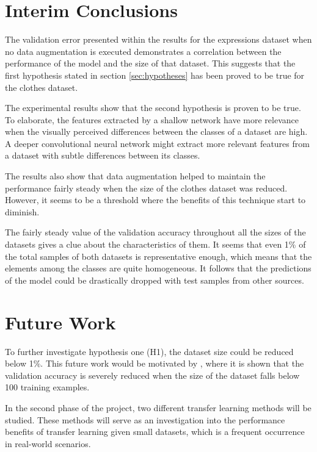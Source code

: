 \documentclass{article}
\begin{document}
\section{Interim Conclusions}
\label{sec:conclusions}

The validation error presented within the results for the expressions dataset when no data augmentation is executed demonstrates a correlation between the performance of the model and the size of that dataset. This suggests that the first hypothesis stated in section \ref{sec:hypotheses} has been proved to be true for the clothes dataset. 

The experimental results show that the second hypothesis is proven to be true. To elaborate, the features extracted by a shallow network have more relevance when the visually perceived differences between the classes of a dataset are high. A deeper convolutional neural network might extract more relevant features from a dataset with subtle differences between its classes.

The results also show that data augmentation helped to maintain the performance fairly steady when the size of the clothes dataset was reduced. However, it seems to be a threshold where the benefits of this technique start to diminish.

The fairly steady value of the validation accuracy throughout all the sizes of the datasets gives a clue about the characteristics of them. It seems that even 1\% of the total samples of both datasets is representative enough, which means that the elements among the classes are quite homogeneous. It follows that the predictions of the model could be drastically dropped with test samples from other sources.


\section{Future Work}
\label{sec:future}

To further investigate hypothesis one (H1), the dataset size could be reduced below 1\%. This future work would be motivated by \cite{cho2015much}, where it is shown that the validation accuracy is severely reduced when the size of the dataset falls below 100 training examples.

In the second phase of the project, two different transfer learning methods will be studied. These methods will serve as an investigation into the performance benefits of transfer learning given small datasets, which is a frequent occurrence in real-world scenarios.
\end{document}

